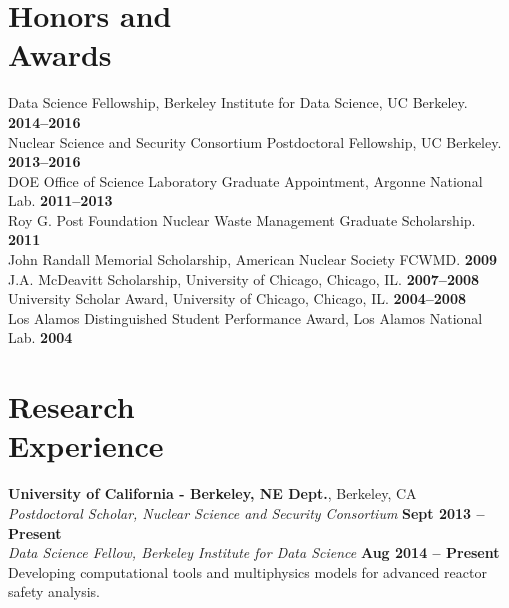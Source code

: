 \documentclass[margin,line]{resume}
\begin{document}
\begin{resume}
    \section{\mysidestyle Honors and\\Awards} 
                Data Science Fellowship, Berkeley Institute for Data Science, UC Berkeley.    \hfill \textbf{2014--2016}\vspace{.5mm}\\%
                Nuclear Science and Security Consortium Postdoctoral Fellowship, UC Berkeley. \hfill \textbf{2013--2016}\vspace{.5mm}\\%
		DOE Office of Science Laboratory Graduate Appointment, Argonne National Lab.  \hfill \textbf{2011--2013}\vspace{.5mm}\\%
		Roy G. Post Foundation Nuclear Waste Management Graduate Scholarship.               \hfill \textbf{2011}\vspace{.5mm}\\%
		John Randall Memorial Scholarship, American Nuclear Society FCWMD.                  \hfill \textbf{2009}\vspace{.5mm}\\%
		J.A. McDeavitt Scholarship, University of Chicago, Chicago, IL.                \hfill\textbf{2007--2008}\vspace{.5mm}\\%
		University Scholar Award, University of Chicago, Chicago, IL.                  \hfill\textbf{2004--2008}\vspace{.5mm}\\%
		Los Alamos Distinguished Student Performance Award, Los Alamos National Lab.                        \hfill\textbf{2004}%
    \section{\mysidestyle Research\\Experience}
    \textbf{University of California - Berkeley, NE Dept.}, Berkeley, CA \\
		\textsl{Postdoctoral Scholar, Nuclear Science and Security Consortium} \hfill \textbf{Sept 2013 -- Present}\\
		\textsl{Data Science Fellow, Berkeley Institute for Data Science} \hfill \textbf{Aug 2014 -- Present}\\
                Developing computational tools and multiphysics models for advanced reactor safety analysis.


\end{resume}
\end{document}

